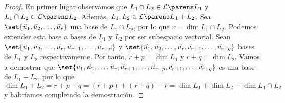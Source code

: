\documentclass[../algebra_lineal.tex]{subfiles}
\begin{document}
\begin{proof}
    En primer lugar observamos que $L_1 \cap L_2 \in \subespaciosde{L_1}$ y  $L_1 \cap L_2 \in \subespaciosde{L_2}$. Además, $L_1, L_2 \in \subespaciosde{L_1 + L_2}$. Sea $\set{\vlst{u}{r}}$ una base de $L_1 \cap L_2$, por lo que $r = \dim{L_1 \cap L_2}$. Podemos extender esta base a bases de $L_1$ y $L_2$ por ser subespacio vectorial. Sean $\set{\vlst{u}{r}, \vu_{r+1}, \dots, \vu_{r+p}}$ y $\set{\vlst{u}{r}, \vv_{r+1}, \dots, \vv_{r+q}}$ bases de $L_1$ y $L_2$ respectivamente. Por tanto, $r+p=\dim{L_1}$ y $r+q=\dim{L_2}$.
    Vamos a demostrar que  $\set{\vlst{u}{r}, \vu_{r+1}, \dots, \vu_{r+p}, \vv_{r+1}, \dots, \vv_{r+q}}$ es una base de $L_1+L_2$, por lo que $\dim{L_1+L_2} = r+p+q = (r+p) + (r+q) - r = \dim{L_1} + \dim{L_2} - \dim{L_1 \cap L_2} $ y habríamos completado la demostración.


\end{proof}
\end{document}

